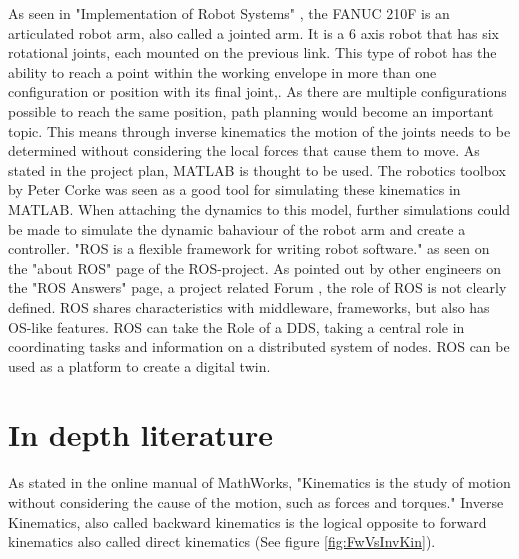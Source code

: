 As seen in "Implementation of Robot Systems" \cite{IndustrialRobotArm}, the FANUC 210F is an articulated robot arm, also called a jointed arm. It is a 6 axis robot that has six rotational joints, each mounted on the previous link. %
This type of robot has the ability to reach a point within the working envelope in more than one configuration or position with its final joint,. 
As there are multiple configurations possible to reach the same position, path planning would become an important topic. 
This means through inverse kinematics  the motion of the joints needs to be determined without considering the local forces that cause them to move.
As stated in the project plan, MATLAB is thought to be used.
The robotics toolbox by Peter Corke was seen as a good tool for simulating these kinematics in MATLAB. 
When attaching the dynamics to this model, further simulations could be made to simulate the dynamic bahaviour of the robot arm and create a controller. %
"\ac{ROS} is a flexible framework for writing robot software." as seen on the "about ROS" page of the ROS-project. As pointed out by other engineers on the "ROS Answers" page, a project related Forum \cite{ROSAnswers_WhatIsRos}, the role of ROS is not clearly defined. ROS shares characteristics with middleware, frameworks, but also has \ac{OS}-like features. \ac{ROS} can take the Role of a \ac{DDS}, taking a central role in coordinating tasks and information on a distributed system of nodes. ROS can be used as a platform to create a digital twin.  %
\medskip

\section{In depth literature}

As stated in the online manual of MathWorks, "Kinematics is the study of motion without considering the cause of the motion, such as forces and torques." \cite{MathWorksInverseKinematics}
Inverse Kinematics, also called backward kinematics is the logical opposite to forward kinematics also called direct kinematics (See figure \ref{fig:FwVsInvKin}). 


